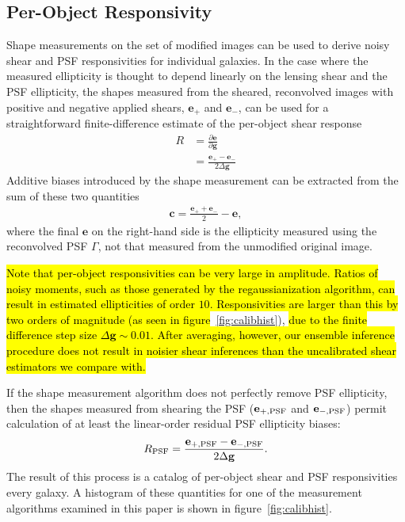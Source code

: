 \documentclass[iop]{emulateapj}
\begin{document}
\subsection{Per-Object Responsivity}
Shape measurements on the set of modified images can be used to derive
noisy shear and PSF responsivities for individual galaxies. In the
case where the measured ellipticity is thought to depend linearly on
the lensing shear and the PSF ellipticity, the shapes measured from
the sheared, reconvolved images with positive and negative applied
shears, $\mathbf{e}_+$ and $\mathbf{e}_-$, can be used for a
straightforward finite-difference estimate of the per-object shear
response
\begin{align}
R &= \frac{\partial \mathbf{e}}{\partial \mathbf{g}}  \\
 &=\frac{\mathbf{e}_{+} - \mathbf{e}_{-}}{2\Delta\mathbf{g}}
\end{align}
Additive biases introduced by the shape measurement can be extracted from the
sum of these two quantities
\begin{align}
\mathbf{c} = \frac{\mathbf{e}_+ + \mathbf{e}_-}{2} - \mathbf{e},
\end{align}
where the final $\mathbf{e}$ on the right-hand side is the ellipticity
measured using the reconvolved PSF $\Gamma$, not that measured from
the unmodified original image.

\hl{Note that per-object responsivities can be very large in
amplitude. Ratios of noisy moments, such as those generated by the
regaussianization algorithm, can result in estimated ellipticities of
order $10$. Responsivities are larger than this by two orders of
magnitude (as seen in figure}~\ref{fig:calibhist}), \hl{due to the finite
difference step size $\Delta \mathbf{g}\sim 0.01$. After averaging,
however, our ensemble inference procedure does not result in noisier
shear inferences than the uncalibrated shear estimators we compare with.}

If the shape measurement algorithm does not perfectly remove PSF
ellipticity, then the shapes measured from shearing the PSF
($\mathbf{e}_{+,\rm PSF}$ and $\mathbf{e}_{-,\rm PSF}$) permit
calculation of at least the linear-order residual PSF ellipticity
biases:
\begin{align}
R_{\rm PSF} = \frac{\mathbf{e}_{+,\rm PSF} - \mathbf{e}_{-,\rm PSF}}{2\Delta\mathbf{g}}.
\end{align}
The result of this process is a catalog of per-object shear and PSF
responsivities every galaxy.  A histogram of these quantities for one
of the measurement algorithms examined in this paper is shown in
figure~\ref{fig:calibhist}. 
\end{document}
